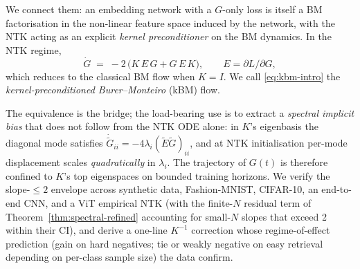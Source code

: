 \documentclass{article}
\newcommand{\E}{E}
\newcommand{\Gtilde}{\widetilde{G}}
\newcommand{\Etilde}{\widetilde{\E}}
\begin{document}
We connect them: an embedding network with a $G$-only loss is
itself a BM factorisation in the non-linear feature space induced by
the network, with the NTK acting as an explicit \emph{kernel
preconditioner} on the BM dynamics. In the NTK regime,
\begin{equation}
\label{eq:kbm-intro}
\dot{G} \;=\; -2\,\bigl(K\,\E\,G + G\,\E\,K\bigr),
\qquad \E = \partial L / \partial G,
\end{equation}
which reduces to the classical BM flow when $K = I$. We call \eqref{eq:kbm-intro}
the \emph{kernel-preconditioned Burer--Monteiro} (kBM) flow.

The equivalence is the bridge; the load-bearing use is to extract a
\emph{spectral implicit bias} that does not follow from the NTK ODE
alone: in $K$'s eigenbasis the diagonal mode satisfies
$\dot{\Gtilde}_{ii} = -4 \lambda_i (\Etilde\Gtilde)_{ii}$, and at NTK
initialisation per-mode displacement scales \emph{quadratically} in
$\lambda_i$. The trajectory of $G(t)$ is therefore confined to $K$'s
top eigenspaces on bounded training horizons. We verify the
slope-$\leq 2$ envelope across synthetic data, Fashion-MNIST,
CIFAR-10, an end-to-end CNN, and a ViT empirical NTK (with the
finite-$N$ residual term of
Theorem~\ref{thm:spectral-refined} accounting for small-$N$ slopes
that exceed 2 within their CI), and derive a one-line $K^{-1}$
correction whose regime-of-effect prediction (gain on hard negatives;
tie or weakly negative on easy retrieval depending on per-class
sample size) the data confirm.
\end{document}

